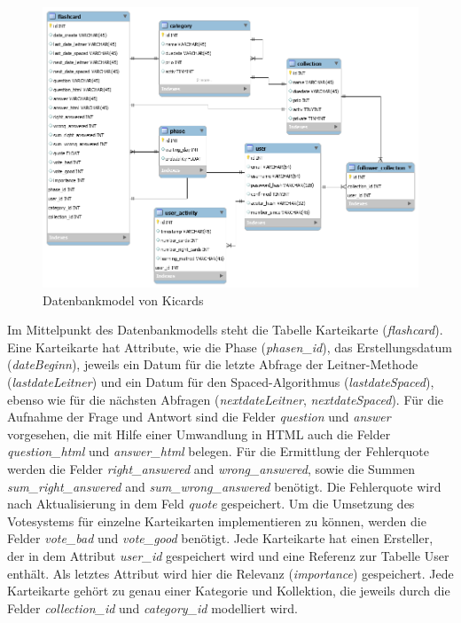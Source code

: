 \begin{figure}[h]
 \includegraphics[width = 15cm]{databasemodel.png}
 \caption{Datenbankmodel von Kicards}
 \label{fig:datenbankmodel}
\end{figure}


Im Mittelpunkt des Datenbankmodells steht die Tabelle Karteikarte (\emph{flashcard}). Eine Karteikarte hat Attribute, wie die Phase (\emph{phasen{\_}id}), das Erstellungsdatum (\emph{dateBeginn}), jeweils ein Datum für die letzte Abfrage der Leitner-Methode (\emph{lastdateLeitner}) und ein Datum für den Spaced-Algorithmus (\emph{lastdateSpaced}), ebenso wie für die nächsten Abfragen (\emph{nextdateLeitner}, \emph{nextdateSpaced}). Für die Aufnahme der Frage und Antwort sind die Felder \emph{question} und \emph{answer} vorgesehen, die mit Hilfe einer Umwandlung in HTML auch die Felder \emph{question{\_}html} und \emph{answer{\_}html} belegen. Für die Ermittlung der Fehlerquote werden die Felder \emph{right{\_}answered} and \emph{wrong{\_}answered}, sowie die Summen \emph{sum{\_}right{\_}answered} and \emph{sum{\_}wrong{\_}answered} benötigt. Die Fehlerquote wird nach Aktualisierung in dem Feld \emph{quote} gespeichert. Um die Umsetzung des Votesystems für einzelne Karteikarten implementieren zu können, werden die Felder \emph{vote{\_}bad} und \emph{vote{\_}good} benötigt. Jede Karteikarte hat einen Ersteller, der in dem Attribut \emph{user{\_}id} gespeichert wird und eine Referenz zur Tabelle User enthält. Als letztes Attribut wird hier die Relevanz (\emph{importance}) gespeichert. Jede Karteikarte gehört zu genau einer Kategorie und Kollektion, die jeweils durch die Felder \emph{collection{\_}id} und \emph{category{\_}id} modelliert wird.

